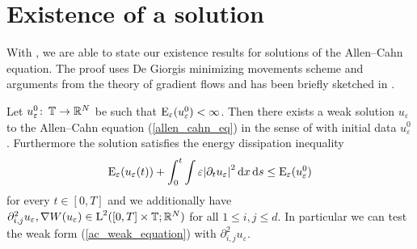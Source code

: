 \section{Existence of a solution}

With , we are able to state our existence results for solutions of the Allen--Cahn equation. The proof uses De Giorgis minimizing movements scheme and arguments from the theory of gradient flows and has been briefly sketched in \cite{convergence_of_allen_cahn_equation_to_multiphase_mean_curvature_flow}.

\begin{theorem}
	\label{existence_of_ac_solution}
	Let $ u_{ \varepsilon}^{ 0 } \colon \operatorname{\mathbb{T}} \to \mathbb{ R }^{ N } $ be such that 
	$ \operatorname{E}_{ \varepsilon } ( u_{ \varepsilon}^{ 0 } ) < \infty $.
	Then there exists a weak solution $ u_{ \varepsilon} $ to the Allen--Cahn equation (\ref{allen_cahn_eq}) in the sense of  with initial data $ u_{ \varepsilon}^{ 0 } $.
	Furthermore the solution satisfies the energy dissipation inequality
	\begin{equation}
		\label{energy_dissipation_sharp}
		\operatorname{E}_{ \varepsilon } ( u_{ \varepsilon } ( t ) )
		+
		\int_{ 0 }^{ t }
		\int
		\varepsilon \abs{ \partial_{ t } u_{ \varepsilon } }^{ 2 }
		\dd{ x }
		\dd{ s }
		\leq
		\operatorname{E}_{ \varepsilon } ( u_{ \varepsilon}^{ 0 } )
	\end{equation}
	for every $ t \in [ 0 , T ] $ and we additionally have
	$
	\partial_{ i , j }^{ 2 } u_{ \varepsilon }, \nabla W ( u_{ \varepsilon } ) \in \operatorname{L}^{ 2 } ( [0, T] \times \operatorname{\mathbb{T}} ; \mathbb{ R }^{ N } ) 
	$
	for all $ 1 \leq i, j \leq d $. In particular we can test the weak form (\ref{ac_weak_equation}) with $ \partial_{ i , j }^{ 2 } u_{ \varepsilon } $.
\end{theorem}

